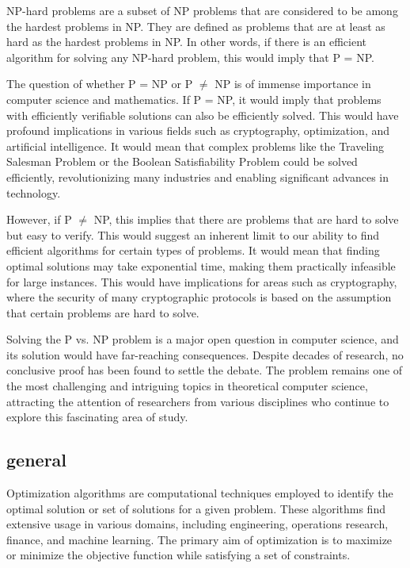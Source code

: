 NP-hard problems are a subset of NP problems that are considered to be among the hardest problems in NP. They are defined as problems that are at least as hard as the hardest problems in NP. In other words, if there is an efficient algorithm for solving any NP-hard problem, this would imply that P = NP.

The question of whether P = NP or P $\neq$ NP is of immense importance in computer science and mathematics. If P = NP, it would imply that problems with efficiently verifiable solutions can also be efficiently solved. This would have profound implications in various fields such as cryptography, optimization, and artificial intelligence. It would mean that complex problems like the Traveling Salesman Problem or the Boolean Satisfiability Problem could be solved efficiently, revolutionizing many industries and enabling significant advances in technology.

However, if P $\neq$ NP, this implies that there are problems that are hard to solve but easy to verify. This would suggest an inherent limit to our ability to find efficient algorithms for certain types of problems. It would mean that finding optimal solutions may take exponential time, making them practically infeasible for large instances. This would have implications for areas such as cryptography, where the security of many cryptographic protocols is based on the assumption that certain problems are hard to solve.

Solving the P vs. NP problem is a major open question in computer science, and its solution would have far-reaching consequences. Despite decades of research, no conclusive proof has been found to settle the debate. The problem remains one of the most challenging and intriguing topics in theoretical computer science, attracting the attention of researchers from various disciplines who continue to explore this fascinating area of study.


\subsection{general}
Optimization algorithms are computational techniques employed to identify the optimal solution or set of solutions for a given problem. These algorithms find extensive usage in various domains, including engineering, operations research, finance, and machine learning. The primary aim of optimization is to maximize or minimize the objective function while satisfying a set of constraints.

